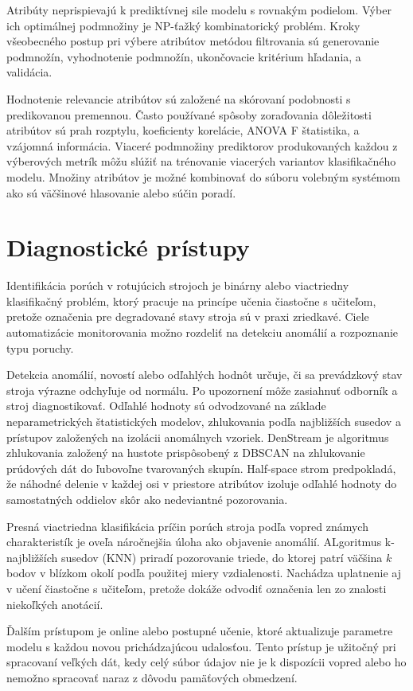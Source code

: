 Atribúty neprispievajú k prediktívnej sile modelu s rovnakým podielom. Výber ich optimálnej podmnožiny je NP-ťažký kombinatorický problém. Kroky všeobecného postup pri výbere atribútov metódou filtrovania sú generovanie podmnožín, vyhodnotenie podmnožín, ukončovacie kritérium hľadania, a validácia.

Hodnotenie relevancie atribútov sú založené na skórovaní podobnosti s predikovanou premennou. Často používané spôsoby zoraďovania dôležitosti atribútov sú prah rozptylu, koeficienty korelácie, ANOVA F štatistika, a vzájomná informácia. Viaceré podmnožiny prediktorov produkovaných každou z výberových metrík môžu slúžiť na trénovanie viacerých variantov klasifikačného modelu. Množiny atribútov je možné kombinovať do súboru volebným systémom ako sú väčšinové hlasovanie alebo súčin poradí.

\section{Diagnostické prístupy}
Identifikácia porúch v rotujúcich strojoch je binárny alebo viactriedny klasifikačný problém, ktorý pracuje na princípe učenia čiastočne s učiteľom, pretože označenia pre degradované stavy stroja sú v praxi zriedkavé. Ciele automatizácie monitorovania možno rozdeliť na detekciu anomálií a rozpoznanie typu poruchy.

Detekcia anomálií, novostí alebo odľahlých hodnôt určuje, či sa prevádzkový stav stroja výrazne odchyľuje od normálu. Po upozornení môže zasiahnuť odborník a stroj diagnostikovať. Odľahlé hodnoty sú odvodzované na základe neparametrických štatistických modelov, zhlukovania podľa najbližších susedov a prístupov založených na izolácii anomálnych vzoriek. DenStream je algoritmus zhlukovania založený na hustote prispôsobený z DBSCAN na zhlukovanie prúdových dát do ľubovoľne tvarovaných skupín. Half-space strom predpokladá, že náhodné delenie v každej osi v priestore atribútov izoluje odľahlé hodnoty do samostatných oddielov skôr ako nedeviantné pozorovania. 

Presná viactriedna klasifikácia príčin porúch stroja podľa vopred známych charakteristík je oveľa náročnejšia úloha ako objavenie anomálií. ALgoritmus k-najbližších susedov (KNN) priradí pozorovanie triede, do ktorej patrí väčšina $k$ bodov v blízkom okolí podľa použitej miery vzdialenosti. Nachádza uplatnenie aj v učení čiastočne s učiteľom, pretože dokáže odvodiť označenia len zo znalosti niekoľkých anotácií.

Ďalším prístupom je online alebo postupné učenie, ktoré aktualizuje parametre modelu s každou novou prichádzajúcou udalosťou. Tento prístup je užitočný pri spracovaní veľkých dát, kedy celý súbor údajov nie je k dispozícii vopred alebo ho nemožno spracovať naraz z dôvodu pamäťových obmedzení.

